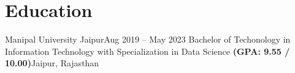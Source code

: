 \section{Education}
    \resumeSubHeadingListStart

    \resumeSubheading
    {Manipal University Jaipur}{Aug 2019 -- May 2023}
    {Bachelor of Techonology in Information Technology with Specialization in Data Science \textbf{(GPA: 9.55 / 10.00)}}{Jaipur, Rajasthan}
    \resumeItemListStart
    \resumeItemListEnd
    \resumeSubHeadingListEnd